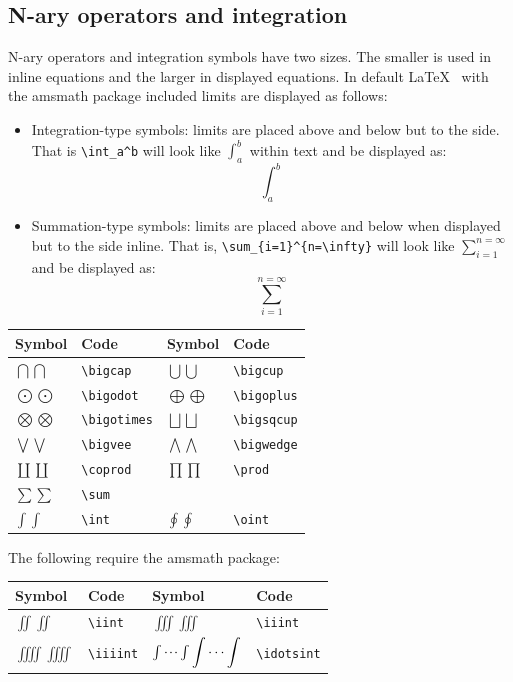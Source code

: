 \documentclass[a4paper,14pt]{extarticle}
\begin{document}
\subsection{N-ary operators and integration}

N-ary operators and integration symbols have two sizes. The smaller is used in inline equations and the larger in displayed equations. In default \LaTeX~ with the amsmath package included limits are displayed as follows:
\begin{itemize}
\item Integration-type symbols: limits are placed above and below but to the side. That is \verb=\int_a^b= will look like  
\(\int_a^b\) within text and be displayed as: 
\[
\int_a^b
\]
\item Summation-type symbols: limits are placed above and below when displayed but to the side inline. That is, \verb-\sum_{i=1}^{n=\infty}- will look like \(\sum_{i=1}^{n=\infty}\) and be displayed as: 
\[
\sum_{i=1}^{n=\infty}
\]
\end{itemize}

\begin{center}
\begin{tabular}
{|p{}p{}|p{}p{}|}
\hline
Symbol & Code & Symbol & Code \\
\hline
\(\bigcap\displaystyle\bigcap\) & \verb=\bigcap= & 
\(\bigcup\displaystyle\bigcup\) & \verb=\bigcup= \\
\(\bigodot\displaystyle\bigodot\) & \verb=\bigodot= & 
\(\bigoplus\displaystyle\bigoplus\) & \verb=\bigoplus= \\
\(\bigotimes\displaystyle\bigotimes\) & \verb=\bigotimes= & 
\(\bigsqcup\displaystyle\bigsqcup\) & \verb=\bigsqcup= \\
\(\bigvee\displaystyle\bigvee\) & \verb=\bigvee= & 
\(\bigwedge\displaystyle\bigwedge\) & \verb=\bigwedge= \\
\(\coprod\displaystyle\coprod\) & \verb=\coprod= & 
\(\prod\displaystyle\prod\) & \verb=\prod= \\
\(\sum\displaystyle\sum\) & \verb=\sum= & & \\
\(\int\displaystyle\int\) & \verb=\int= & 
\(\oint\displaystyle\oint\) & \verb=\oint= \\
\hline
\end{tabular}
\end{center}

The following require the amsmath package:
\begin{center}
\begin{tabular}
{|p{}p{}|p{}p{}|}
\hline
Symbol & Code & Symbol & Code \\
\hline
\(\iint\displaystyle\iint\) & \verb=\iint= & 
\(\iiint\displaystyle\iiint\) & \verb=\iiint= \\
\(\iiiint\displaystyle\iiiint\) & \verb=\iiiint= &
\(\idotsint\displaystyle\idotsint\) & \verb=\idotsint= \\
\hline
\end{tabular}
\end{center}
\end{document}
